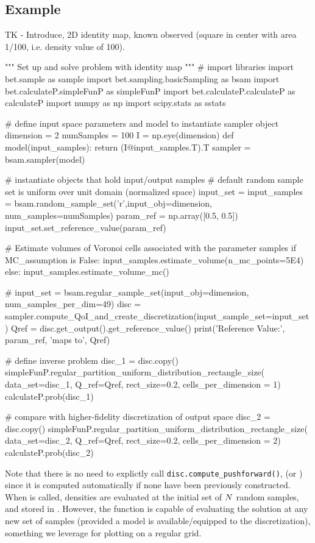 \subsection{Example}\label{sec:set-example}

TK - Introduce, 2D identity map, known observed (square in center with area 1/100, i.e. density value of 100).

\begin{python}
"""
Set up and solve problem with identity map
"""
# import libraries
import bet.sample as sample
import bet.sampling.basicSampling as bsam
import bet.calculateP.simpleFunP as simpleFunP
import bet.calculateP.calculateP as calculateP
import numpy as np
import scipy.stats as sstats

# define input space parameters and model to instantiate sampler object
dimension = 2
numSamples = 100
I = np.eye(dimension)
def model(input_samples):
        return (I@input_samples.T).T
sampler = bsam.sampler(model)

# instantiate objects that hold input/output samples
# default random sample set is uniform over unit domain (normalized space)
input_set = input_samples = bsam.random_sample_set('r',input_obj=dimension, num_samples=numSamples)
param_ref = np.array([0.5, 0.5])
input_set.set_reference_value(param_ref)

# Estimate volumes of Voronoi cells associated with the parameter samples
if MC_assumption is False:
    input_samples.estimate_volume(n_mc_points=5E4)
else:
    input_samples.estimate_volume_mc()

# input_set = bsam.regular_sample_set(input_obj=dimension, num_samples_per_dim=49)
disc = sampler.compute_QoI_and_create_discretization(input_sample_set=input_set)
Qref = disc.get_output().get_reference_value()
print('Reference Value:', param_ref, 'maps to', Qref)

# define inverse problem
disc_1 = disc.copy()
simpleFunP.regular_partition_uniform_distribution_rectangle_size(
        data_set=disc_1, Q_ref=Qref, rect_size=0.2,
        cells_per_dimension = 1)
calculateP.prob(disc_1)

# compare with higher-fidelity discretization of output space
disc_2 = disc.copy()
simpleFunP.regular_partition_uniform_distribution_rectangle_size(
        data_set=disc_2, Q_ref=Qref, rect_size=0.2,
        cells_per_dimension = 2)
calculateP.prob(disc_2)

\end{python}

Note that there is no need to explictly call {\tt disc.compute\_pushforward()}, (or ) since it is computed automatically if none have been previously constructed.
When  is called, densities are evaluated at the initial set of $N$ random samples, and stored in .
However, the function  is capable of evaluating the solution at any new set of samples (provided a model is available/equipped to the discretization), something we leverage for plotting on a regular grid.


